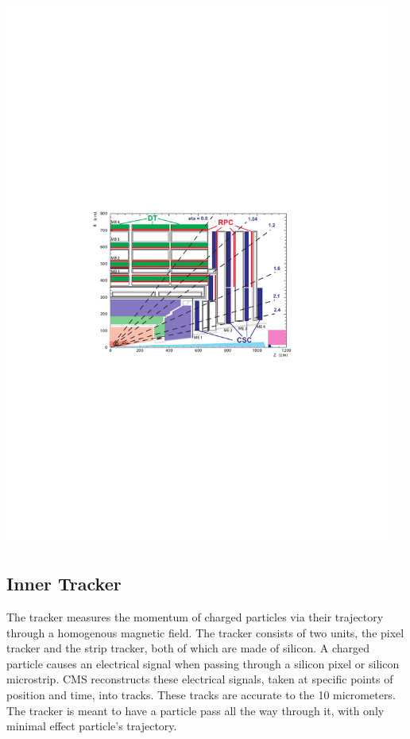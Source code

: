 \centerline{
\includegraphics[width=5in]{Chapter3/importfigs/Figure_001-006.pdf}
}

\subsection{Inner Tracker}

The tracker measures the momentum of charged particles via their trajectory through a homogenous magnetic field. The tracker consists of two units, the pixel tracker and the strip tracker, both of which are made of silicon. A charged particle causes an electrical signal when passing through a silicon pixel or silicon microstrip. CMS reconstructs these electrical signals, taken at specific points of position and time, into tracks. These tracks are accurate to the 10 micrometers. The tracker is meant to have  a particle pass all the way through it, with only minimal effect particle's trajectory.

